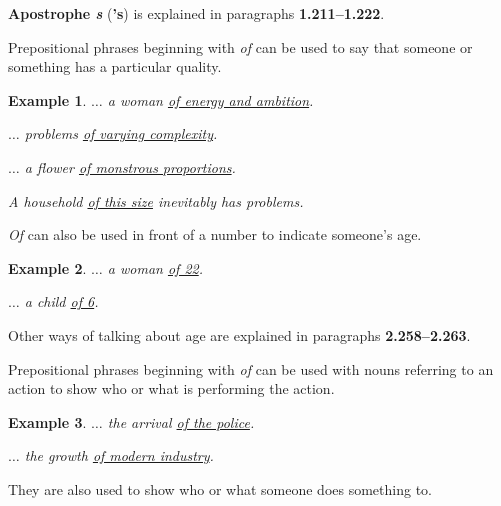 \documentclass[oneside]{book}
\numberwithin{equation}{section}
\newtheorem{example}{Example}[section]
\begin{document}
\textbf{Apostrophe \textit{s}} (\textbf{'s}) is explained in paragraphs \textbf{1.211--1.222}.

%
\noindent{} Prepositional phrases beginning with \textit{of} can be used to say that someone or something has a particular quality.
\begin{example}
    $\ldots$ a woman \underline{of energy and ambition}.
    
    $\ldots$ problems \underline{of varying complexity}.
    
    $\ldots$ a flower \underline{of monstrous proportions}.
    
    A household \underline{of this size} inevitably has problems.
\end{example}
\textit{Of} can also be used in front of a number to indicate someone's age.
\begin{example}
    $\ldots$ a woman \underline{of 22}.
    
    $\ldots$ a child \underline{of 6}.
\end{example}
Other ways of talking about age are explained in paragraphs \textbf{2.258--2.263}.

%
\noindent{} Prepositional phrases beginning with \textit{of} can be used with nouns referring to an action to show who or what is performing the action.
\begin{example}
    $\ldots$ the arrival \underline{of the police}.
    
    $\ldots$ the growth \underline{of modern industry}.
\end{example}
They are also used to show who or what someone does something to.
\end{document}
